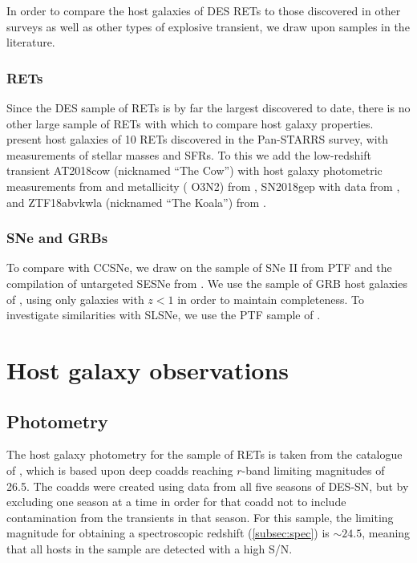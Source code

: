 \documentclass[fleqn,usenatbib,]{mnras}
\begin{document}
In order to compare the host galaxies of DES RETs to those discovered in other surveys as well as other types of explosive transient, we draw upon samples in the literature. 

\subsubsection{RETs \label{subsubsec:compare_rets}}
Since the DES sample of RETs is by far the largest discovered to date, there is no other large sample of RETs with which to compare host galaxy properties. \citet{Drout2014} present host galaxies of 10 RETs discovered in the Pan-STARRS survey, with measurements of stellar masses and SFRs. To this we add the low-redshift transient AT2018cow (nicknamed ``The Cow'') with host galaxy photometric measurements from \citet{Perley2019} and metallicity (\citealt{Pettini2004} O3N2) from \citet{Morokuma-Matsui2019}, SN2018gep with data from  \citet{Ho2019}, and ZTF18abvkwla (nicknamed ``The Koala'') from \citet{Ho2020}.

\subsubsection{SNe and GRBs \label{subsubsec:compare_CCSNe}}

To compare with CCSNe, we draw on the sample of SNe II from PTF \citep{Stoll2013} and the compilation of untargeted SESNe from \citet{Sanders2012}. We use the sample of GRB host galaxies of \citet{Kruehler2015}, using only galaxies with $z<1$ in order to maintain completeness. To investigate similarities with SLSNe, we use the PTF sample of \citet{Perley2016c}.

\section{Host galaxy observations \label{sec:obs}}
\subsection{Photometry \label{subsec:phot}}

The host galaxy photometry for the sample of RETs is taken from the catalogue of \citet{Wiseman2020}, which is based upon deep coadds reaching $r$-band limiting magnitudes of 26.5. The coadds were created using data from all five seasons of DES-SN, but by excluding one season at a time in order for that coadd not to include contamination from the transients in that season. For this sample, the limiting magnitude for obtaining a spectroscopic redshift (\ref{subsec:spec}) is $\sim 24.5$, meaning that all hosts in the sample are detected with a high S/N.
\end{document}
